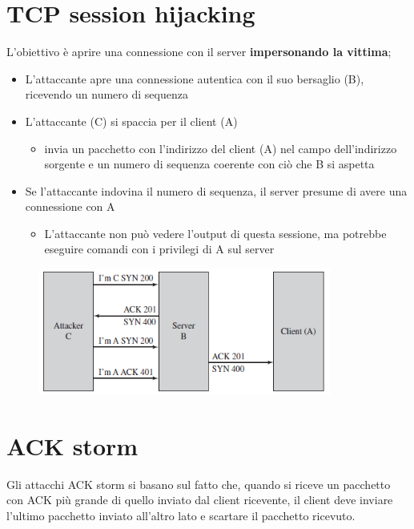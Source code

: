 \section{TCP session hijacking}

L'obiettivo è aprire una connessione con il server \textbf{impersonando la vittima}; 

\begin{itemize}
    \item L'attaccante apre una connessione autentica con il suo bersaglio (B), ricevendo un numero di sequenza 
    \item L'attaccante (C) si spaccia per il client (A)
    \begin{itemize}
        \item invia un pacchetto con l'indirizzo del client (A) nel campo dell'indirizzo sorgente
        e un numero di sequenza coerente con ciò che B si aspetta
    \end{itemize}
    \item Se l'attaccante indovina il numero di sequenza, il server presume di avere una connessione con A 
    \begin{itemize}
        \item L'attaccante non può vedere l'output di questa sessione, ma potrebbe eseguire comandi con i privilegi 
        di A sul server
    \end{itemize}
\end{itemize}

\begin{figure}[H]
    \centering
    \includegraphics[width=0.8\linewidth]{chapters/8/images/tcp-hijack.png}
\end{figure}


\section{ACK storm}
Gli attacchi ACK storm si basano sul fatto che, quando si riceve un pacchetto con ACK più 
grande di quello inviato dal client ricevente, il client deve inviare l'ultimo pacchetto 
inviato all'altro lato e scartare il pacchetto ricevuto.

